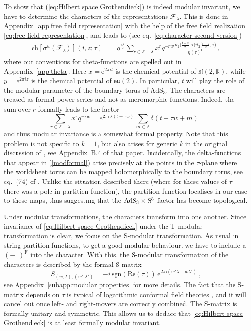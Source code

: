 \documentclass[12pt,a4paper]{article}
\newcommand{\be}{\begin{equation}}
\newcommand{\ee}{\end{equation}}
\begin{document}
To show that (\ref{eq:Hilbert space Grothendieck}) is indeed modular invariant, we have to determine the characters of the representations $\mathscr{F}_\lambda$. This is done in Appendix~\ref{app:free field representation} with the help of the free field realization \eqref{eq:free field representation}, and leads to (see eq.~\eqref{eq:character second version})
\begin{align}
\mathrm{ch}[\sigma^w(\mathscr{F}_\lambda)](t,z;\tau)
&=q^{\frac{w^2}{2}} \sum_{r \in \mathds{Z}+\lambda} x^r q^{-rw} \frac{\vartheta_2\big(\frac{t+z}{2};\tau\big)\vartheta_2\big(\frac{t-z}{2};\tau\big)}{\eta(\tau)^4}\ , \label{eq:psu112 character}
\end{align}
where our conventions for theta-functions are spelled out in Appendix~\ref{app:theta}. 
Here $x=\mathrm{e}^{2\pi i t}$ is the chemical potential of $\mathfrak{sl}(2,\mathds{R})$, while $y=e^{2\pi i z}$ is the chemical potential of $\mathfrak{su}(2)$. In particular, $t$ will play the role of the modular parameter of the boundary torus of $\mathrm{AdS}_3$. The characters are treated as formal power series and not as meromorphic functions. Indeed, the sum over $r$ formally leads to the factor 
\be\label{modformal}
\sum_{r \in \mathds{Z}+\lambda} x^r q^{-rw} = e^{2\pi i \lambda(t - \tau w)} \, \sum_{m\in\mathds{Z}}  \delta(t-\tau w + m) \ ,
\ee
and thus modular invariance is a somewhat formal property. Note that this problem is not specific to $k=1$, but also arises for generic $k$ in the original discussion of \cite{Maldacena:2000hw}, see Appendix~B.4 of that paper. Incidentally, the delta-functions that appear in (\ref{modformal}) arise precisely at the points in the $\tau$-plane where the worldsheet torus can be mapped holomorphically to the boundary torus, see eq.~(74) of \cite{Maldacena:2000kv}. Unlike the situation described there (where for these values of $\tau$ there was a pole in partition function), the partition function localises in our case to these maps, thus suggesting that the ${\rm AdS}_3\times {\rm S}^3$ factor has become topological.


Under modular transformations, the characters transform into one another. Since invariance of \eqref{eq:Hilbert space Grothendieck} under the T-modular transformation is clear, we focus on the S-modular transformation. As usual in string partition functions, to get a good modular behaviour, we have to include a $(-1)^{\mathrm{F}}$ into the character. With this, the S-modular transformation of the characters is described by the formal S-matrix
\be \label{Smatrix}
S_{(w,\lambda),(w',\lambda')}=-i\, \mathrm{sgn}(\mathrm{Re}(\tau))\, \mathrm{e}^{2\pi i(w'\lambda+w\lambda')}\ ,
\ee
see Appendix~\ref{subapp:modular properties} for more details.
The fact that the S-matrix depends on $\tau$ is typical of logarithmic conformal field theories
\cite{Miyamoto:2002ar,Flohr:2005cm}, and it will cancel out once left- and right-movers are correctly combined. The S-matrix is formally unitary and symmetric. This allows us to deduce  that \eqref{eq:Hilbert space Grothendieck} is at least formally modular invariant.
\end{document}
